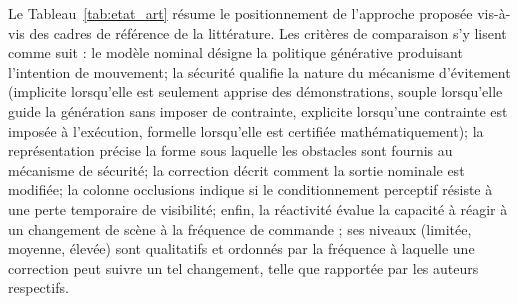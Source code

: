 \vspace{1em}
\noindent Le Tableau~\ref{tab:etat_art} résume le positionnement de l'approche proposée vis-à-vis des cadres de référence de la littérature. Les critères de comparaison s'y lisent comme suit : le modèle nominal désigne la politique générative produisant l'intention de mouvement; la sécurité qualifie la nature du mécanisme d'évitement (implicite lorsqu'elle est seulement apprise des démonstrations, souple lorsqu'elle guide la génération sans imposer de contrainte, explicite lorsqu'une contrainte est imposée à l'exécution, formelle lorsqu'elle est certifiée mathématiquement); la représentation précise la forme sous laquelle les obstacles sont fournis au mécanisme de sécurité; la correction décrit comment la sortie nominale est modifiée; la colonne occlusions indique si le conditionnement perceptif résiste à une perte temporaire de visibilité; enfin, la réactivité évalue la capacité à réagir à un changement de scène à la fréquence de commande ; ses niveaux (limitée, moyenne, élevée) sont qualitatifs et ordonnés par la fréquence à laquelle une correction peut suivre un tel changement, telle que rapportée par les auteurs respectifs.

